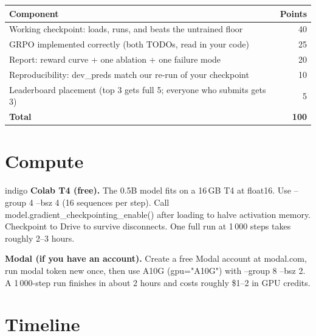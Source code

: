 \documentclass[11pt]{article}
\newcommand{\codesm}[1]{{\ttfamily\footnotesize #1}}
\begin{document}
\begin{center}
\renewcommand{\arraystretch}{1.35}
\begin{tabular}{l r}
\toprule
\textbf{Component} & \textbf{Points} \\
\midrule
Working checkpoint: loads, runs, and beats the untrained floor & 40 \\
GRPO implemented correctly (both TODOs, read in your code) & 25 \\
Report: reward curve + one ablation + one failure mode & 20 \\
Reproducibility: \codesm{dev\_preds} match our re-run of your checkpoint & 10 \\
Leaderboard placement (top 3 gets full 5; everyone who submits gets 3) & 5 \\
\midrule
\textbf{Total} & \textbf{100} \\
\bottomrule
\end{tabular}
\end{center}

\section{Compute}

\begin{qbox}{indigo}
\textbf{Colab T4 (free).}
The 0.5B model fits on a 16\,GB T4 at \codesm{float16}.
Use \codesm{--group 4 --bsz 4} (16 sequences per step).
Call \codesm{model.gradient\_checkpointing\_enable()} after loading to halve activation memory.
Checkpoint to Drive to survive disconnects.
One full run at 1\,000 steps takes roughly 2--3 hours.

\vspace{0.4em}
\textbf{Modal (if you have an account).}
Create a free Modal account at \codesm{modal.com}, run \codesm{modal token new} once, then use
\codesm{A10G} (\codesm{gpu="A10G"}) with \codesm{--group 8 --bsz 2}.
A 1\,000-step run finishes in about 2 hours and costs roughly \$1--2 in GPU credits.
\end{qbox}

\section{Timeline}
\end{document}

